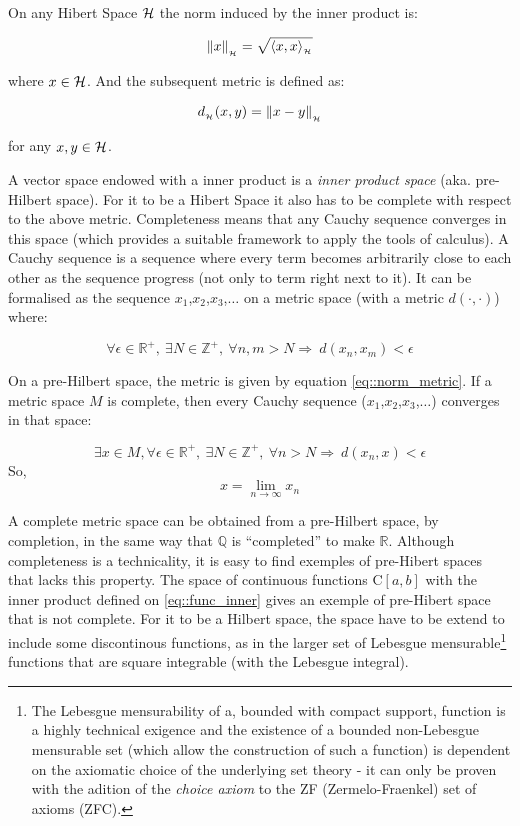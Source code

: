 On any Hibert Space $\mathcal{H}$ the norm induced by the inner product is:

\begin{equation}
  \left\lVert x\right\rVert_{_{\mathcal{H}}} = \sqrt{ \langle x,x\rangle_{_{\mathcal{H}}} }
\end{equation}

where $x \in \mathcal{H}$. And the subsequent metric is defined as:

\begin{equation}\label{eq::norm_metric}
  d_{_{\mathcal{H}}}(x,y) = \left\lVert x - y \right\rVert_{_{\mathcal{H}}}
\end{equation}

for any $x,y \in \mathcal{H}$.

A vector space endowed with a inner product is a \textit{inner product space}
(aka. pre-Hilbert space). For it to be a Hibert Space it also has to be complete
with respect to the above metric. Completeness means that any Cauchy sequence
converges in this space (which provides a suitable framework to apply the tools
of calculus). A Cauchy sequence is a sequence where every term becomes
arbitrarily close to each other as the sequence progress (not only to term
right next to it). It can be formalised as the sequence
$x_1$,$x_2$,$x_3$,$\ldots$ on a metric space (with a metric $d( \cdot ,\cdot)$)
where:


\[ \forall \epsilon \in \mathbb{R}^+, ~\exists N \in \mathbb{Z}^+, ~\forall
n,m>N \Longrightarrow ~d(x_n,x_m)<\epsilon
\]

On a pre-Hilbert space, the metric is given by equation \ref{eq::norm_metric}.
If a metric space $M$ is complete, then every Cauchy sequence
($x_1$,$x_2$,$x_3$,$\ldots$) converges in that space:

\[ \exists x \in M, \forall \epsilon \in \mathbb{R}^+, ~\exists N \in \mathbb{Z}^+, ~\forall
n>N \Longrightarrow ~d(x_n,x)<\epsilon
\]
So,
\[ x = \lim_{n\to\infty} x_n \]

A complete metric space can be obtained from a pre-Hilbert space, by completion,
in the same way that $\mathbb{Q}$ is ``completed'' to make $\mathbb{R}$.
Although completeness is a technicality, it is easy to find exemples of
pre-Hibert spaces that lacks this property. The space of continuous functions
C$[a,b]$ with the inner product defined on \ref{eq::func_inner} gives an exemple
of pre-Hibert space that is not complete. For it to be a Hilbert space, the
space have to be extend to include some discontinous functions, as in the larger
set of Lebesgue mensurable\footnote{The Lebesgue mensurability of a, bounded
with compact support, function is a highly technical exigence and the existence
of a bounded non-Lebesgue mensurable set (which allow the construction of such a
function) is dependent on the axiomatic choice of the underlying set theory - it
can only be proven with the adition of the \textit{choice axiom} to the
ZF (Zermelo-Fraenkel) set of axioms (ZFC). } functions that are square
integrable (with the Lebesgue integral).

